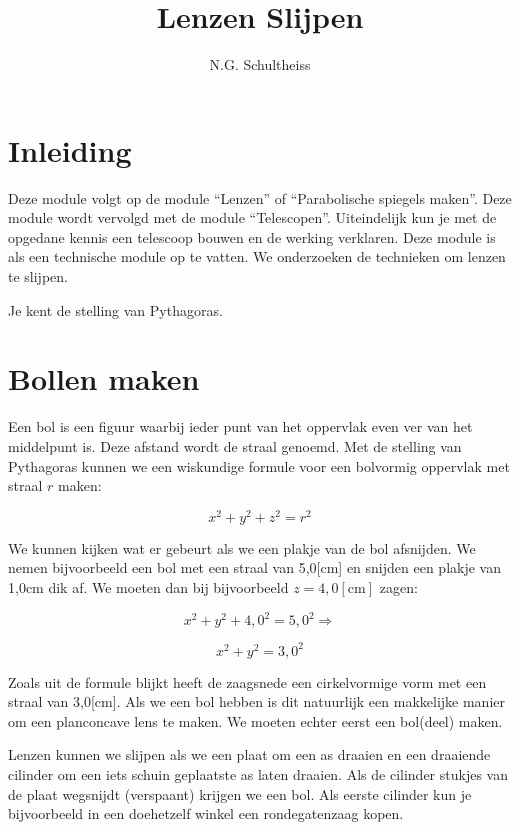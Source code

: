 



\title{Lenzen Slijpen}
\author{N.G. Schultheiss}
\date{}

\maketitle
\thispagestyle{firststyle}

\section{Inleiding}

Deze module volgt op de module ``Lenzen'' of ``Parabolische spiegels
maken''. Deze module wordt vervolgd met de module ``Telescopen''.
Uiteindelijk kun je met de opgedane kennis een telescoop bouwen en
de werking verklaren. Deze module is als een technische module op
te vatten. We onderzoeken de technieken om lenzen te slijpen.

Je kent de stelling van Pythagoras.


\section{Bollen maken}

Een bol is een figuur waarbij ieder punt van het oppervlak even ver
van het middelpunt is. Deze afstand wordt de straal genoemd. Met de
stelling van Pythagoras kunnen we een wiskundige formule voor een
bolvormig oppervlak met straal $r$ maken:

\[
x^{2}+y^{2}+z^{2}=r^{2}
\]


We kunnen kijken wat er gebeurt als we een plakje van de bol afsnijden.
We nemen bijvoorbeeld een bol met een straal van 5,0{[}cm{]} en snijden
een plakje van 1,0cm dik af. We moeten dan bij bijvoorbeeld $z=4,0[\mathrm{cm}]$
zagen:

\[
x^{2}+y^{2}+4,0^{2}=5,0^{2}\Rightarrow
\]


\[
x^{2}+y^{2}=3,0^{2}
\]


Zoals uit de formule blijkt heeft de zaagsnede een cirkelvormige vorm
met een straal van 3,0{[}cm{]}. Als we een bol hebben is dit natuurlijk
een makkelijke manier om een planconcave lens te maken. We moeten
echter eerst een bol(deel) maken.

Lenzen kunnen we slijpen als we een plaat om een as draaien en een
draaiende cilinder om een iets schuin geplaatste as laten draaien.
Als de cilinder stukjes van de plaat wegsnijdt (verspaant) krijgen
we een bol. Als eerste cilinder kun je bijvoorbeeld in een doehetzelf
winkel een rondegatenzaag kopen.


